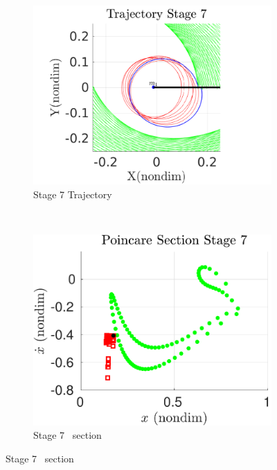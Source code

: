\begin{figure}[htbp]
    \begin{subfigure}[htbp]{0.5\textwidth} 
        \includegraphics[width=\textwidth, keepaspectratio]{figures/2017_JAS/stage7_trajectory_zoom.pdf} 
        \caption{Stage 7 Trajectory~\label{fig:stage7_trajecotry_zoom}} 
    \end{subfigure}~
    \begin{subfigure}[htbp]{0.5\textwidth} 
        \includegraphics[width=\textwidth, keepaspectratio]{figures/2017_JAS/stage7_poincare.pdf} 
        \caption{Stage 7 \Poincare~section \label{fig:stage7_poincare}} 
    \end{subfigure}
 

\end{figure}
